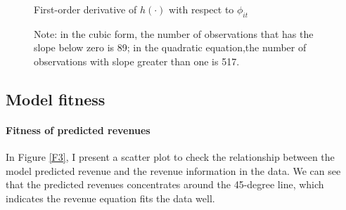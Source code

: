 \documentclass[English]{article}
\begin{document}
\begin{figure}[H]
  \centering
  \caption{First-order derivative of $h(\cdot)$ with respect to $\phi_{it}$}
  \hfill
 \caption*{Note: in the cubic form, the number of observations that has the slope below zero is 89; in the quadratic equation,the number of observations with slope greater than one is 517. }
\end{figure}

\subsection{Model fitness}
\paragraph{Fitness of predicted revenues} In Figure \ref{F3}, I present a scatter plot to check the relationship between the model predicted revenue and the revenue information in the data. We can see that the predicted revenues concentrates around the 45-degree line, which indicates the revenue equation fits the data well. 
\end{document}
